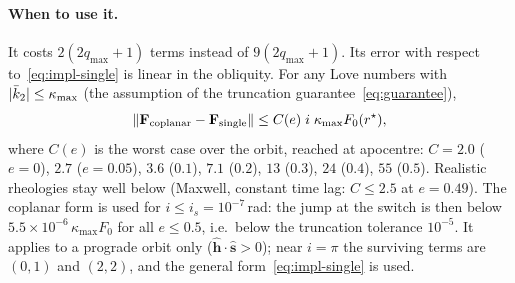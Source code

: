 \paragraph{When to use it.} It costs $2(2q_{\max}+1)$ terms instead of $9(2q_{\max}+1)$. Its error with respect to~\eqref{eq:impl-single} is linear in the obliquity. For any Love numbers with $|\bar k_2|\le\kappa_{\max}$ (the assumption of the truncation guarantee~\eqref{eq:guarantee}),
\begin{equation}
  \|\mathbf F_{\rm coplanar}-\mathbf F_{\rm single}\|\le C(e)\;i\;\kappa_{\max}F_0(r^\star), \label{eq:coplanar-switch}
\end{equation}
where $C(e)$ is the worst case over the orbit, reached at apocentre: $C=2.0$ ($e=0$), $2.7$ ($e=0.05$), $3.6$ ($0.1$), $7.1$ ($0.2$), $13$ ($0.3$), $24$ ($0.4$), $55$ ($0.5$). Realistic rheologies stay well below (Maxwell, constant time lag: $C\le2.5$ at $e=0.49$). The coplanar form is used for $i\le i_s=10^{-7}$\,rad: the jump at the switch is then below $5.5\times10^{-6}\,\kappa_{\max}F_0$ for all $e\le0.5$, i.e.\ below the truncation tolerance $10^{-5}$. It applies to a prograde orbit only ($\hat{\mathbf h}\cdot\hat{\mathbf s}>0$); near $i=\pi$ the surviving terms are $(0,1)$ and $(2,2)$, and the general form~\eqref{eq:impl-single} is used.

